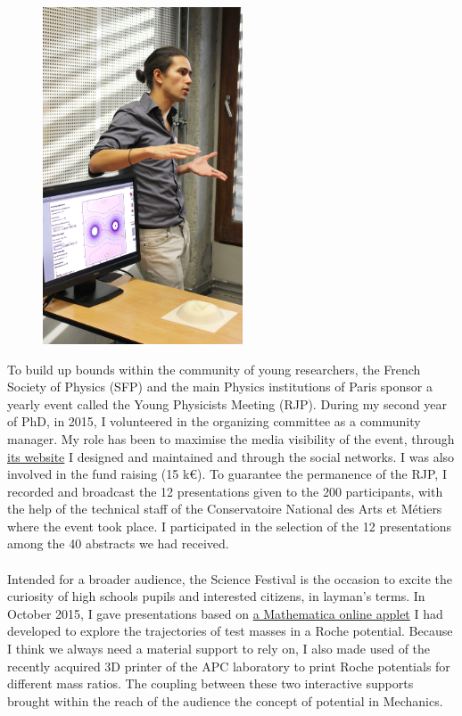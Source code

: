 \documentclass[a4paper,12pt,onecolumn]{article}
\begin{document}
\begin{figure}
\vspace*{-0.8cm}
\begin{center}
\includegraphics[height=10cm]{Figures/FIG7.jpg}
\end{center}
\end{figure} 
To build up bounds within the community of young researchers, the French Society of Physics (SFP) and the main Physics institutions of Paris sponsor a yearly event called the Young Physicists Meeting (RJP). During my second year of PhD, in 2015, I volunteered in the organizing committee as a community manager. My role has been to maximise the media visibility of the event, through \href{http://rjp.sfp-paris.fr/index2015.html}{its website} I designed and maintained and through the social networks. I was also involved in the fund raising (15 k\euro{}). To guarantee the permanence of the RJP, I recorded and broadcast the 12 presentations given to the 200 participants, with the help of the technical staff of the Conservatoire National des Arts et M\'etiers where the event took place. I participated in the selection of the 12 presentations among the 40 abstracts we had received.\\ \\
\indent Intended for a broader audience, the Science Festival is the occasion to excite the curiosity of high schools pupils and interested citizens, in layman's terms. In October 2015, I gave presentations based on \href{}{a Mathematica online applet} I had developed to explore the trajectories of test masses in a Roche potential. Because I think we always need a material support to rely on, I also made used of the recently acquired 3D printer of the APC laboratory to print Roche potentials for different mass ratios. The coupling between these two interactive supports brought within the reach of the audience the concept of potential in Mechanics.\\ \\
\end{document}

